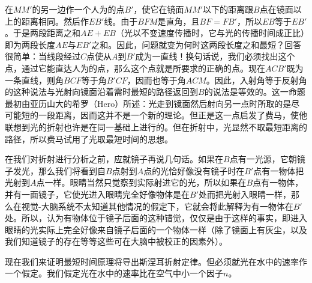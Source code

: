 在$MM'$的另一边作一个人为的点$B'$，使它在镜面$MM'$以下的距离跟$B$点在镜面以上的距离相同。然后作$EB'$线。由于$BFM$是直角，且$BF=FB'$，所以$EB$等于$EB'$。于是两段距离之和$AE+EB$（光以不变速度传播时，它与光的传播时间成正比）即为两段长度$AE$与$EB'$之和。因此，问题就变为何时这两段长度之和最短？回答很简单：当线段经过$C$点使从$A$到$B'$成为一直线！换句话说，我们必须找出这个点，通过它能直达人为的点，那么这个点就是所要求的正确的点。现在$ACB'$既为一条直线，则角$BCF$等于角$B'CF$，因而也等于角$ACM$。因此，入射角等于反射角的这种说法与光射向镜面沿着需时最短的路径返回到$B$的说法是等效的。这一命题最初由亚历山大的希罗（Hero）所述：光走到镜面然后射向另一点时所取的是尽可能短的一段距离，因而这并不是一个新的理论。但正是这一点启发了费马，使他联想到光的折射也许是在同一基础上进行的。但在折射中，光显然不取最短距离的路径，所以费马试用了光取最短时间的思想。

在我们对折射进行分析之前，应就镜子再说几句话。如果在$B$点有一光源，它朝镜子发光，那么我们将看到自$B$点射到$A$点的光恰好像没有镜子时在$B'$点有一物体把光射到$A$点一样。眼睛当然只觉察到实际射进它的光，所以如果在$B$点有一物体，并有一面镜子，它使光进入眼睛完全好像物体是在$B'$处而把光射入眼睛一样，那么在视觉-大脑系统不太知道其他情况的假定下，它就会将此解释为有一物体在$B'$处。所以，认为有物体位于镜子后面的这种错觉，仅仅是由于这样的事实，即进入眼睛的光实际上完全好像来自镜子后面的一个物体一样（除了镜面上有灰尘，以及我们知道镜子的存在等等这些可在大脑中被校正的因素外）。

现在我们来证明最短时间原理将导出斯涅耳折射定律。但必须就光在水中的速率作一个假定。我们假定光在水中的速率比在空气中小一个因子$n$。

